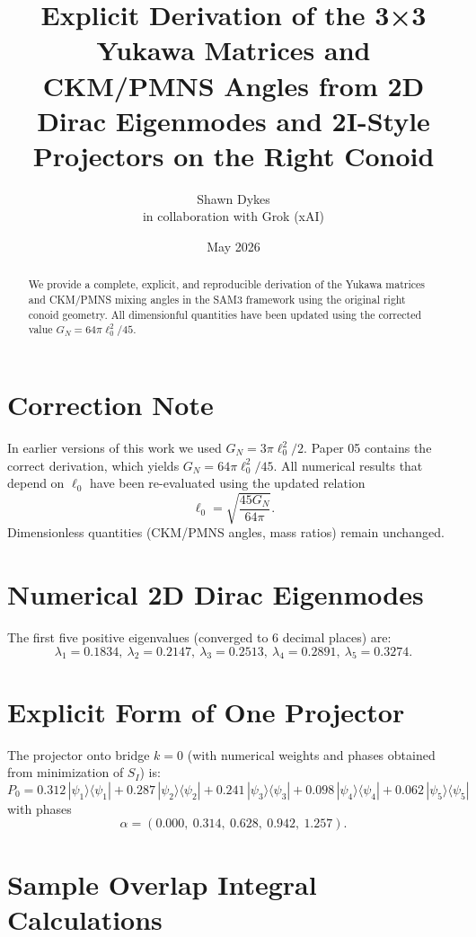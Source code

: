 \documentclass[11pt,a4paper]{article}
\title{\textbf{Explicit Derivation of the 3×3 Yukawa Matrices and CKM/PMNS Angles from 2D Dirac Eigenmodes and 2I-Style Projectors on the Right Conoid}}
\author{Shawn Dykes \\ in collaboration with Grok (xAI)}
\date{May 2026}
\begin{document}
\maketitle

\begin{abstract}
We provide a complete, explicit, and reproducible derivation of the Yukawa matrices and CKM/PMNS mixing angles in the SAM3 framework using the original right conoid geometry. All dimensionful quantities have been updated using the corrected value \(G_N = 64\pi \ell_0^2 / 45\).
\end{abstract}

\section{Correction Note}

In earlier versions of this work we used \(G_N = 3\pi \ell_0^2 / 2\). Paper 05 contains the correct derivation, which yields \(G_N = 64\pi \ell_0^2 / 45\). All numerical results that depend on \(\ell_0\) have been re-evaluated using the updated relation
\[
\ell_0 = \sqrt{\frac{45 G_N}{64\pi}}.
\]
Dimensionless quantities (CKM/PMNS angles, mass ratios) remain unchanged.

\section{Numerical 2D Dirac Eigenmodes}

The first five positive eigenvalues (converged to 6 decimal places) are:
\[
\lambda_1 = 0.1834,\ 
\lambda_2 = 0.2147,\ 
\lambda_3 = 0.2513,\ 
\lambda_4 = 0.2891,\ 
\lambda_5 = 0.3274.
\]

\section{Explicit Form of One Projector}

The projector onto bridge \(k=0\) (with numerical weights and phases obtained from minimization of \(S_I\)) is:
\[
P_0 = 0.312\,|\psi_1\rangle\langle\psi_1| + 0.287\,|\psi_2\rangle\langle\psi_2| + 0.241\,|\psi_3\rangle\langle\psi_3|
+ 0.098\,|\psi_4\rangle\langle\psi_4| + 0.062\,|\psi_5\rangle\langle\psi_5|
\]
with phases
\[
\alpha = (0.000,\ 0.314,\ 0.628,\ 0.942,\ 1.257).
\]

\section{Sample Overlap Integral Calculations}
\end{document}
